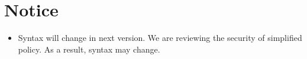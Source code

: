 \section{Notice}
 \begin{itemize}
  \item Syntax will change in next version. We are reviewing the
	security  of simplified policy. As a result, syntax may change.
 \end{itemize}

 
